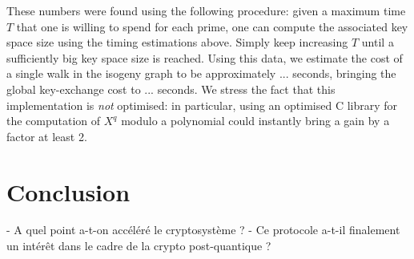 \documentclass{article}
\theoremstyle{definition}
\begin{document}
These numbers were found using the following procedure: given a maximum time
$T$ that one is willing to spend for each prime, one can compute the
associated key space size using the timing estimations above. Simply keep
increasing $T$ until a sufficiently big key space size is reached.
Using this data, we estimate the cost of a single walk in the
isogeny graph to be approximately ... seconds, bringing the global
key-exchange cost to ... seconds. We stress the fact that this implementation
is \emph{not} optimised: in particular, using an optimised C library
for the computation of $X^q$ modulo a polynomial could instantly bring a
gain by a factor at least 2.


\section{Conclusion}

- A quel point a-t-on accéléré le cryptosystème ?
- Ce protocole a-t-il finalement un intérêt dans le cadre de la crypto post-quantique ?




\end{document}
